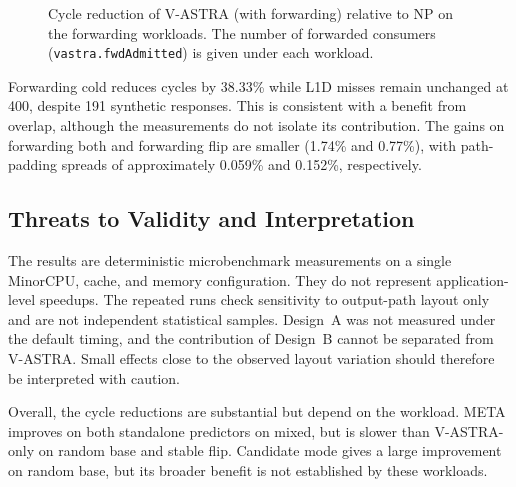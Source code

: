\begin{figure}[H]
    \centering
    \caption{Cycle reduction of V-ASTRA (with forwarding) relative to NP
    on the forwarding workloads. The number of forwarded consumers
    (\texttt{vastra.fwdAdmitted}) is given under each workload.}
    \label{tab:forwarding-performance}
\end{figure}

Forwarding cold reduces cycles by 38.33\% while L1D misses remain
unchanged at 400, despite 191 synthetic responses. This is consistent
with a benefit from overlap, although the measurements do not isolate
its contribution. The gains on forwarding both and forwarding flip
are smaller (1.74\% and 0.77\%), with path-padding spreads of
approximately 0.059\% and 0.152\%, respectively.

\subsection{Threats to Validity and Interpretation}
\label{subsec:performance-limitations}

The results are deterministic microbenchmark measurements on a single
MinorCPU, cache, and memory configuration. They do not represent
application-level speedups. The repeated runs check sensitivity to
output-path layout only and are not independent statistical samples.
Design~A was not measured under the default timing, and the
contribution of Design~B cannot be separated from V-ASTRA. Small
effects close to the observed layout variation should therefore be
interpreted with caution.

Overall, the cycle reductions are substantial but depend on the
workload. META improves on both standalone predictors on mixed, but is
slower than V-ASTRA-only on random base and stable flip. Candidate mode
gives a large improvement on random base, but its broader benefit is not
established by these workloads.
